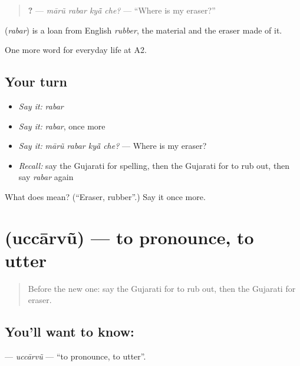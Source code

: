 \begin{quote}
\textbf{   ?} — \emph{mārũ rabar kyā̃ che?} — \textquotedblleft{}Where is my eraser?\textquotedblright{}
\end{quote}

\begin{cousinweb}
\textbf{} (\emph{rabar}) is a loan from English \emph{rubber}, the material and the eraser made of it.
\end{cousinweb}

\begin{grammarlens}[title={What you've built}]
One more word for everyday life at A2.
\end{grammarlens}

\subsection*{Your turn}
\begin{itemize}
\raggedright
  \item \emph{Say it:} \emph{rabar}
  \item \emph{Say it:} \emph{rabar}, once more
  \item \emph{Say it:} \emph{mārũ rabar kyā̃ che?} — Where is my eraser?
  \item \emph{Recall:} say the Gujarati for spelling, then the Gujarati for to rub out, then say \emph{rabar} again
\end{itemize}

\begin{tcolorbox}[breakable,colback=teal!4,colframe=teal!35!black,title={Before you move on}]
What does  mean? (\textquotedblleft{}Eraser, rubber\textquotedblright{}.) Say it once more.
\end{tcolorbox}
\section[\texorpdfstring{\gu{ઉચ્ચારવું} (uccārvũ)}{ઉચ્ચારવું (uccārvũ)}]{ (uccārvũ) — to pronounce, to utter}

\label{lesson:GU-C245-uccarvu}



\begin{quote}
Before the new one: say the Gujarati for to rub out, then the Gujarati for eraser.
\end{quote}

\subsection*{You'll want to know: }
\textbf{} — \emph{uccārvũ} — \textquotedblleft{}to pronounce, to utter\textquotedblright{}.

